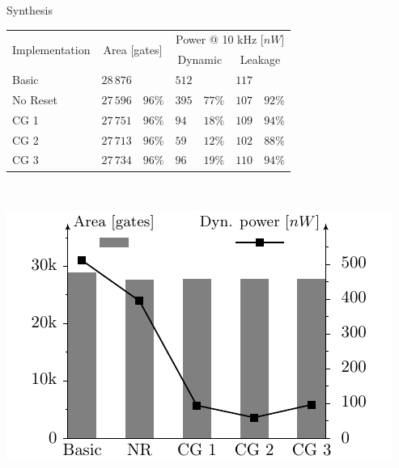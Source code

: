 \documentclass[svgnames, handout,t]{beamer}
\newenvironment{changemargin}[2]{%
\begin{list}{}{%
\setlength{\topsep}{0pt}%
\setlength{\leftmargin}{#1}%
\setlength{\rightmargin}{#2}%
\setlength{\listparindent}{\parindent}%
\setlength{\itemindent}{\parindent}%
\setlength{\parsep}{\parskip}%
}%
\item[]}{\end{list}}
\begin{document}
\begin{frame}{Synthesis}
	\begin{center}
		\tiny{\begin{tabular}{llrlrlr}
			\\[-2em]
			\toprule
			\multirow{2}{*}{Implementation}	& \multicolumn{2}{c}{\multirow{2}{*}{Area [gates]}}	& \multicolumn{4}{c}{Power @ 10 kHz [$nW$]}\\
			\cmidrule{4-7}
			&	& & \multicolumn{2}{c}{Dynamic}	& \multicolumn{2}{c}{Leakage}\\
			\midrule
			Basic			& $28\,876$	& 			& $512$	&	 		& $117$ 	& \\
			No Reset		& $27\,596$	& $96\%$	& $395$	& $77\%$	& $107$ 	& $92\%$\\
			CG 1			& $27\,751$	& $96\%$	& $94$	& $18\%$	& $109$	& $94\%$\\
			CG 2			& $27\,713$	& $96\%$	& $59$	& $12\%$	& $102$	& $88\%$\\
			CG 3			& $27\,734$	& $96\%$	& $96$	& $19\%$	& $110$	& $94\%$\\
			\bottomrule		
		\end{tabular}}

		\\[2em]

		\begin{changemargin}{-1cm}{-1cm}\begin{center}
			\includegraphics[width=0.45\paperwidth]{images/results-m1-en}
		\end{center}\end{changemargin}
	\end{center}
\end{frame}
\end{document}
